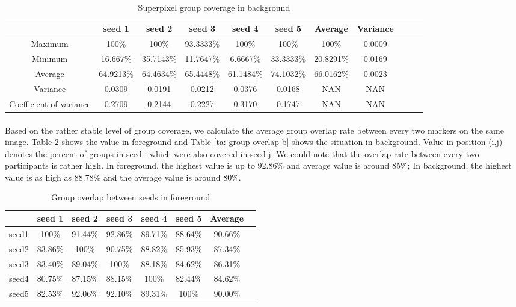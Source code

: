 \documentclass[runningheads,a4paper]{llncs}
\begin{document}
\begin{table}
\centering
\begin{tabular}{|c|c|c|c|c|c|c|c|c|c|c|}
\hline
 & seed 1 & seed 2&seed 3&seed 4&seed 5&Average&Variance \\
\hline
Maximum& 100\% & 100\% & 93.3333\%& 100\%& 100\%&100\%&0.0009\\
\hline
Minimum& 16.667\% & 35.7143\% & 11.7647\%& 6.6667\%& 33.3333\%&20.8291\%&0.0169\\
\hline
Average& 64.9213\% & 64.4634\% & 65.4448\%& 61.1484\%& 74.1032\%&66.0162\%&0.0023 \\
\hline
Variance& 0.0309 & 0.0191 & 0.0212& 0.0376& 0.0168&NAN&NAN \\
\hline
Coefficient of variance& 0.2709 & 0.2144 & 0.2227& 0.3170& 0.1747&NAN&NAN \\
\hline
\end{tabular}
\caption{Superpixel group coverage in background}
\label{ta: label coverage b}
\end{table} 


\paragraph{} Based on the rather stable level of group coverage, we calculate the average group overlap rate between every two markers on the same image. Table \ref{ta: group overlap f} shows the value in foreground and Table \ref{ta: group overlap b} shows the situation in background. Value in position (i,j) denotes the percent of groups in seed i which were also covered in seed j. We could note that the overlap rate between every two participants is rather high. In foreground, the highest value is up to 92.86\% and average value is around 85\%; In background, the highest value is as high as 88.78\% and the average value is around 80\%.

\begin{table}
\centering
\begin{tabular}{|c|c|c|c|c|c|c|c|}
\hline
 & seed 1 & seed 2&seed 3&seed 4&seed 5&Average\\
\hline
seed1& 100\% & 91.44\% & 92.86\%& 89.71\%& 88.64\%&90.66\%\\
\hline
seed2& 83.86\% & 100\% & 90.75\%& 88.82\%& 85.93\%&87.34\%\\
\hline
seed3& 83.40\% & 89.04\% & 100\%& 88.18\%& 84.62\%&86.31\% \\
\hline
seed4& 80.75\% & 87.15\% & 88.15\%& 100\%& 82.44\%&84.62\% \\
\hline
seed5& 82.53\% & 92.06\% & 92.10\%& 89.31\%& 100\%&90.00\% \\
\hline
\end{tabular}
\caption{Group overlap between seeds in foreground }
\label{ta: group overlap f}
\end{table} 
\end{document}
